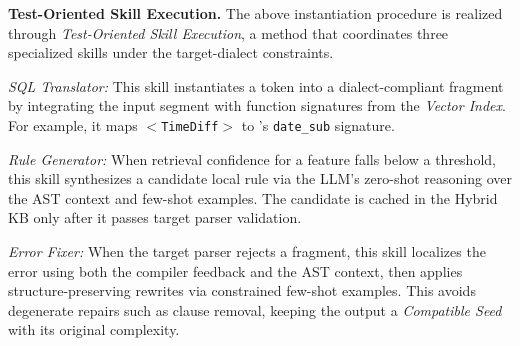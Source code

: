 \documentclass[conference]{IEEEtran}
\begin{document}
\textbf{Test-Oriented Skill Execution.} The above instantiation procedure is realized through \textit{Test-Oriented Skill Execution},
a method that coordinates three specialized skills under the target-dialect constraints.

\textit{SQL Translator:} This skill instantiates a token into a dialect-compliant fragment by integrating the input segment with function signatures from the \textit{Vector Index}. For example, it maps $<$\texttt{TimeDiff}$>$ to \duckdb{}'s \texttt{date\_sub} signature.

\textit{Rule Generator:} When retrieval confidence for a feature falls below a threshold, this skill synthesizes a candidate local rule via the LLM's zero-shot reasoning over the AST context and few-shot examples. The candidate is cached in the Hybrid KB only after it passes target parser validation.


\textit{Error Fixer:} When the target parser rejects a fragment, this skill localizes the error using both the compiler feedback and the AST context, then applies structure-preserving rewrites via constrained few-shot examples. This avoids degenerate repairs such as clause removal, keeping the output a \textit{Compatible Seed} with its original complexity.
\end{document}
